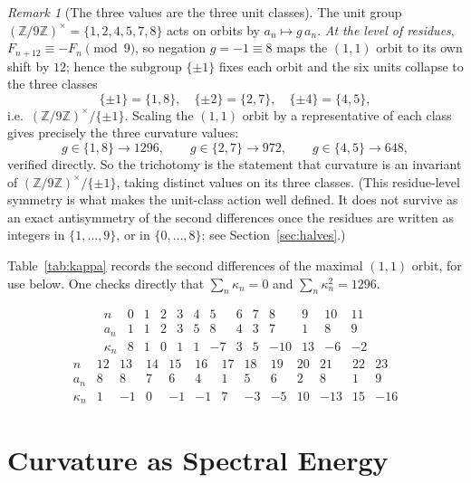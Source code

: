 \documentclass[12pt]{article}
\theoremstyle{remark}
\newtheorem{rem}{Remark}
\begin{document}
\begin{rem}[The three values are the three unit classes]\label{rem:units}
The unit group $(\mathbb Z/9\mathbb Z)^\times=\{1,2,4,5,7,8\}$ acts on orbits by
$a_n\mapsto g\,a_n$. \emph{At the level of residues}, $F_{n+12}\equiv -F_n\pmod 9$, so
negation $g=-1\equiv 8$ maps the $(1,1)$ orbit to its own shift by $12$; hence the subgroup
$\{\pm1\}$ fixes each orbit and the six units collapse to the three classes
\[
\{\pm1\}=\{1,8\},\quad \{\pm2\}=\{2,7\},\quad \{\pm4\}=\{4,5\},
\]
i.e.\ $(\mathbb Z/9\mathbb Z)^\times/\{\pm1\}$. Scaling the $(1,1)$ orbit by a
representative of each class gives precisely the three curvature values:
\[
g\in\{1,8\}\!\to\!1296,\qquad g\in\{2,7\}\!\to\!972,\qquad g\in\{4,5\}\!\to\!648,
\]
verified directly. So the trichotomy is the statement that curvature is an invariant of
$(\mathbb Z/9\mathbb Z)^\times/\{\pm1\}$, taking distinct values on its three classes.
(This residue-level symmetry is what makes the unit-class action well defined. It does
not survive as an exact antisymmetry of the second differences once the residues are
written as integers in $\{1,\dots,9\}$, or in $\{0,\dots,8\}$; see
Section~\ref{sec:halves}.)
\end{rem}

Table~\ref{tab:kappa} records the second differences of the maximal $(1,1)$ orbit, for use
below. One checks directly that $\sum_n\kappa_n=0$ and $\sum_n\kappa_n^2=1296$.

\begin{table}[!ht]
\centering
\[
\begin{array}{c|cccccccccccc}
n & 0 & 1 & 2 & 3 & 4 & 5 & 6 & 7 & 8 & 9 & 10 & 11\\\hline
a_n & 1 & 1 & 2 & 3 & 5 & 8 & 4 & 3 & 7 & 1 & 8 & 9\\
\kappa_n & 8 & 1 & 0 & 1 & 1 & -7 & 3 & 5 & -10 & 13 & -6 & -2
\end{array}
\]
\[
\begin{array}{c|cccccccccccc}
n & 12 & 13 & 14 & 15 & 16 & 17 & 18 & 19 & 20 & 21 & 22 & 23\\\hline
a_n & 8 & 8 & 7 & 6 & 4 & 1 & 5 & 6 & 2 & 8 & 1 & 9\\
\kappa_n & 1 & -1 & 0 & -1 & -1 & 7 & -3 & -5 & 10 & -13 & 15 & -16
\end{array}
\]
\caption{Second differences for the $(1,1)$ orbit. $\sum\kappa_n=0$, $\sum\kappa_n^2=1296$.}
\label{tab:kappa}
\end{table}

\section{Curvature as Spectral Energy}\label{sec:spectral}
\end{document}
